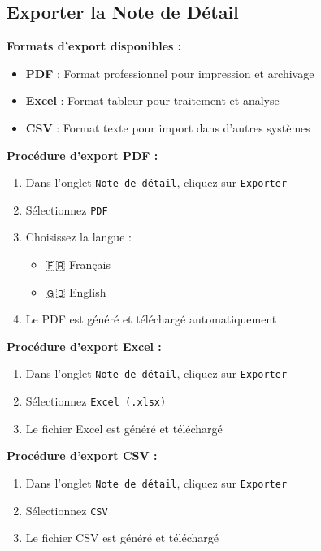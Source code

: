 \documentclass[12pt,a4paper]{report}
\begin{document}
\subsection{Exporter la Note de Détail}

\textbf{Formats d'export disponibles :}

\begin{itemize}[leftmargin=*]
    \item \textbf{PDF} : Format professionnel pour impression et archivage
    \item \textbf{Excel} : Format tableur pour traitement et analyse
    \item \textbf{CSV} : Format texte pour import dans d'autres systèmes
\end{itemize}

\textbf{Procédure d'export PDF :}

\begin{enumerate}[leftmargin=*]
    \item Dans l'onglet \texttt{Note de détail}, cliquez sur \texttt{Exporter}
    \item Sélectionnez \texttt{PDF}
    \item Choisissez la langue :
    \begin{itemize}
        \item 🇫🇷 Français
        \item 🇬🇧 English
    \end{itemize}
    \item Le PDF est généré et téléchargé automatiquement
\end{enumerate}

\textbf{Procédure d'export Excel :}

\begin{enumerate}[leftmargin=*]
    \item Dans l'onglet \texttt{Note de détail}, cliquez sur \texttt{Exporter}
    \item Sélectionnez \texttt{Excel (.xlsx)}
    \item Le fichier Excel est généré et téléchargé
\end{enumerate}

\textbf{Procédure d'export CSV :}

\begin{enumerate}[leftmargin=*]
    \item Dans l'onglet \texttt{Note de détail}, cliquez sur \texttt{Exporter}
    \item Sélectionnez \texttt{CSV}
    \item Le fichier CSV est généré et téléchargé
\end{enumerate}
\end{document}
